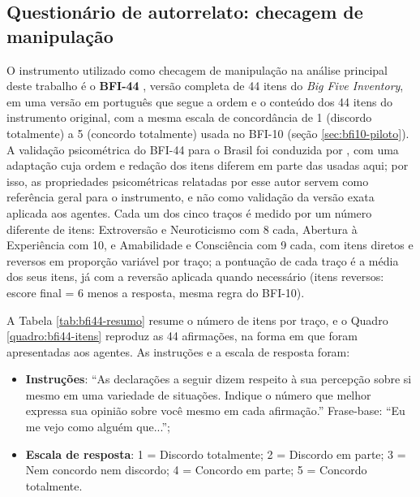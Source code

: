 \subsection{Questionário de autorrelato: checagem de manipulação}
\label{sec:bfi44}

O instrumento utilizado como checagem de manipulação na análise principal
deste trabalho é o \textbf{BFI-44} \cite{johndonahuekentle1991}, versão
completa de 44 itens do \textit{Big Five Inventory}, em uma versão em
português que segue a ordem e o conteúdo dos 44 itens do instrumento
original, com a mesma escala de concordância de 1
(discordo totalmente) a 5 (concordo totalmente) usada no BFI-10 (seção
\ref{sec:bfi10-piloto}). A validação psicométrica do BFI-44 para o
Brasil foi conduzida por , com uma adaptação cuja
ordem e redação dos itens diferem em parte das usadas aqui; por isso, as
propriedades psicométricas relatadas por esse autor servem como
referência geral para o instrumento, e não como validação da versão
exata aplicada aos agentes. Cada um dos cinco traços é medido por um número
diferente de itens: Extroversão e Neuroticismo com 8 cada, Abertura à
Experiência com 10, e Amabilidade e Consciência com 9 cada, com itens
diretos e reversos em proporção variável por traço; a pontuação de cada traço é a média
dos seus itens, já com a reversão aplicada quando necessário (itens
reversos: escore final = 6 menos a resposta, mesma regra do BFI-10).

A Tabela \ref{tab:bfi44-resumo} resume o número de itens por traço, e o
Quadro \ref{quadro:bfi44-itens} reproduz as 44 afirmações, na forma em
que foram apresentadas aos agentes. As instruções e a escala de resposta
foram:

\begin{itemize}
    \item \textbf{Instruções}: ``As declarações a seguir dizem respeito à
    sua percepção sobre si mesmo em uma variedade de situações. Indique o
    número que melhor expressa sua opinião sobre você mesmo em cada
    afirmação.'' Frase-base: ``Eu me vejo como alguém que...'';
    \item \textbf{Escala de resposta}: 1 = Discordo totalmente; 2 =
    Discordo em parte; 3 = Nem concordo nem discordo; 4 = Concordo em
    parte; 5 = Concordo totalmente.
\end{itemize}

